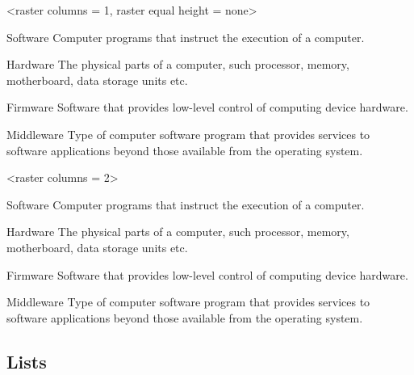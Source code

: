 \documentclass[a4paper, 11pt]{article}
\begin{document}
\begin{tcblisting}{}
    \begin{PLTBoxItemize}
        <raster columns = 1, raster equal height = none>
        \item[Software] Computer programs that instruct the execution of a computer.
        \item[Hardware] The physical parts of a computer, such processor, memory, motherboard, data storage units etc.
        \item[Firmware] Software that provides low-level control of computing device hardware.
        \item[Middleware] Type of computer software program that provides services to software applications beyond those available from the operating system.
    \end{PLTBoxItemize}
\end{tcblisting}

\begin{tcblisting}{}
    \begin{tcolorbox}[colback = black]
        \begin{PLTBoxEnumerate}
            <raster columns = 2>
            \item[Software] Computer programs that instruct the execution of a computer.
            \item[Hardware] The physical parts of a computer, such processor, memory, motherboard, data storage units etc.
            \item[Firmware] Software that provides low-level control of computing device hardware.
            \item[Middleware] Type of computer software program that provides services to software applications beyond those available from the operating system.
        \end{PLTBoxEnumerate}
    \end{tcolorbox}
\end{tcblisting}

\subsection{Lists}\label{sec:enumitem}
\end{document}
